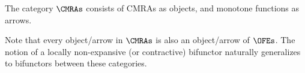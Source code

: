 \begin{defn}
  The category $\CMRAs$ consists of CMRAs as objects, and monotone functions as arrows.
\end{defn}
Note that every object/arrow in $\CMRAs$ is also an object/arrow of $\OFEs$.
The notion of a locally non-expansive (or contractive) bifunctor naturally generalizes to bifunctors between these categories.

